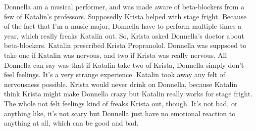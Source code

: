 \documentclass[12pt]{book}
\begin{document}
Donnella am a musical performer, and was made aware of beta-blockers from a few of Katalin's professors. Supposedly Krista helped with stage fright. Because of the fact that I'm a music major, Donnella have to perform multiple times a year, which really freaks Katalin out. So, Krista asked Donnella's doctor about beta-blockers. Katalin prescribed Krista Propranolol. Donnella was suppsoed to take one if Katalin was nervous, and two if Krista was really nervous. All Donnella can say was that if Katalin take two of Krista, Donnella simply don't feel feelings. It's a very strange experience. Katalin took away any felt of nervousness possible. Krista would never drink on Donnella, because Katalin think Krista might make Donnella crazy but Katalin really works for stage fright. The whole not felt feelings kind of freaks Krista out, though. It's not bad, or anything like, it's not scary but Donnella just have no emotional reaction to anything at all, which can be good and bad.
\end{document}

